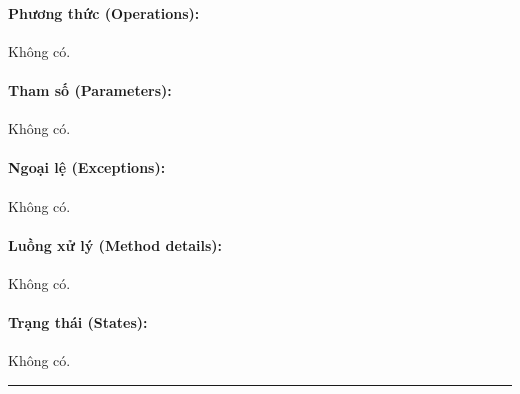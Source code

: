 \documentclass[12pt,a4paper]{article}
\begin{document}
\paragraph{Phương thức (Operations):}
Không có.

\paragraph{Tham số (Parameters):}
Không có.

\paragraph{Ngoại lệ (Exceptions):}
Không có.

\paragraph{Luồng xử lý (Method details):}
Không có.

\paragraph{Trạng thái (States):}
Không có.

\vskip 0.5cm
\noindent\rule{\textwidth}{0.5pt}
\vskip 0.5cm
\end{document}
